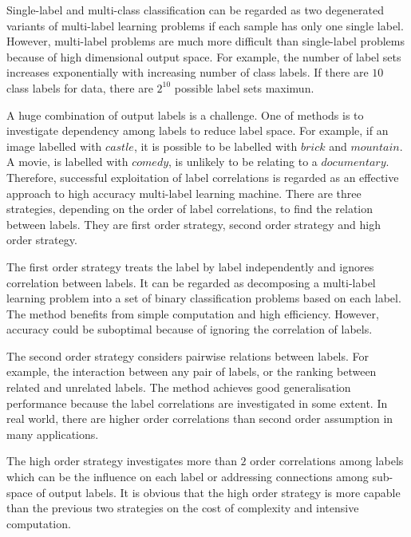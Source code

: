 Single-label and multi-class classification can be regarded as two degenerated variants of multi-label learning problems if each sample has only one single label. However, multi-label problems are much more difficult than single-label problems because of high dimensional output space. For example, the number of label sets increases exponentially with increasing number of class labels. If there are $10$ class labels for data, there are $2^{10}$ possible label sets maximun.

A huge combination of output labels is a challenge. One of methods is to investigate dependency among labels to reduce label space. For example, if an image labelled with $castle$, it is possible to be labelled with $brick$ and $mountain$. A movie, is labelled with $comedy$, is unlikely to be relating to a $documentary$. Therefore, successful exploitation of label correlations is regarded as an effective approach to high accuracy multi-label learning machine. There are three strategies, depending on the order of label correlations, to find the relation between labels. They are first order strategy, second order strategy and high order strategy. 

The first order strategy treats the label by label independently and ignores correlation between labels. It can be regarded as decomposing a multi-label learning problem into a set of binary classification problems based on each label. The method benefits from simple computation and high efficiency. However, accuracy could be suboptimal because of ignoring the correlation of labels.

The second order strategy considers pairwise relations between labels. For example, the interaction between any pair of labels, or the ranking between related and unrelated labels. The method achieves good generalisation performance because the label correlations are investigated in some extent. In real world, there are higher order correlations than second order assumption in many applications.

The high order strategy investigates more than $2$ order correlations among labels which can be the influence on each label or addressing connections among sub-space of output labels. It is obvious that the high order strategy is more capable than the previous two strategies on the cost of complexity and intensive computation.
